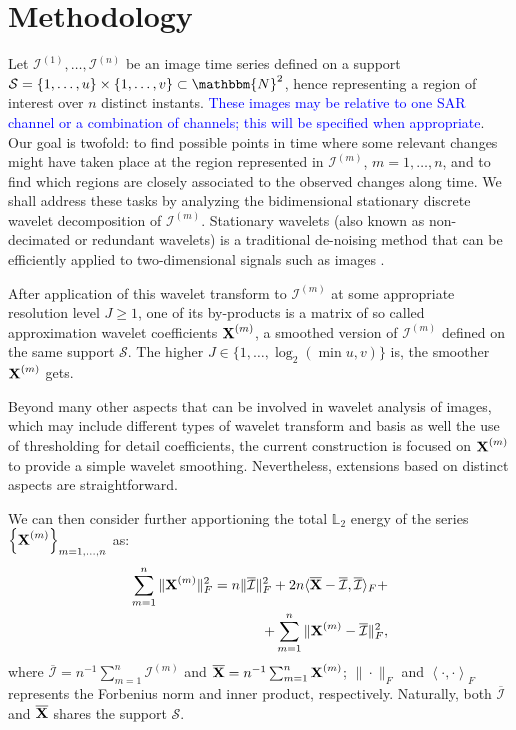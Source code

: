 \documentclass[journal]{IEEEtran}
\newcommand{\vX}{{\textbf X}}
\begin{document}
\section{Methodology}\label{section_method}


Let $\mathcal{I}^{(1)},\ldots,\mathcal{I}^{(n)}$ be an image time series defined on a support $\mathcal{S} = \left\lbrace 1,\ldots,u  \right\rbrace \times \left\lbrace 1,\ldots,v  \right\rbrace \subset \mathbbm{N}^2$, hence representing a region of interest over $n$ distinct instants.
%
\textcolor{blue}{These images may be relative to one SAR channel or a combination of channels; this will be specified when appropriate}. Our goal is twofold: to find possible points in time where some relevant changes might have taken place at the region represented in $\mathcal{I}^{(m)}$, $m=1,\ldots,n$, and to find which regions are closely associated to the observed changes along time. We shall address these tasks by analyzing the bidimensional stationary discrete wavelet decomposition of $\mathcal{I}^{(m)}$. Stationary wavelets (also known as non-decimated or redundant wavelets) is a traditional de-noising method that can be efficiently applied to two-dimensional signals such as images \cite{coifman1995translation,atto2012multidate,atto2016wavelet}. 


After application of this wavelet transform to $\mathcal{I}^{(m)}$ at some appropriate resolution level $J\geq 1$, one of its by-products is a matrix of so called approximation wavelet coefficients $\vX^{(m)}$, a smoothed version of $\mathcal{I}^{(m)}$ 
defined on the same support $\mathcal{S}$. The higher $J\in\{1,\ldots,\log_2( \min{u,v} )\}$ is, the smoother $\vX^{(m)}$ gets.

Beyond many other aspects that can be involved in wavelet analysis of images, which may include different types of wavelet transform and basis as well the use of thresholding for detail coefficients, the current construction is focused on $\vX^{(m)}$ to provide a simple wavelet smoothing. Nevertheless, extensions based on distinct aspects are straightforward.

We can then consider further apportioning the total $\mathbb{L}_2$ energy of the series $\left\{\vX^{(m)}\right\}_{m=1,\ldots,n}$ as:
\begin{equation}\label{E:eq_ANOVAlogimage}
\begin{split}
\sum_{m=1}^n\|\vX^{(m)}\|_F^2
= n\|\overline{\mathcal{I}}\|_F^2 + 2n\langle\overline{\vX}-\overline{\mathcal{I}},\overline{\mathcal{I}}\rangle_F + \\
+ \sum_{m=1}^n\|\mathcal \vX^{(m)} - \overline{\mathcal{I}}\|_F^2,
\end{split}
\end{equation}
where $\overline{\mathcal{I}}=n^{-1}\sum_{m=1}^n\mathcal{I}^{(m)}$ and $\overline{\vX}=n^{-1}\sum_{m=1}^n\vX^{(m)}$; $\| \cdot \|_F$ and $\left\langle \cdot , \cdot \right\rangle_F$ represents the Forbenius norm and inner product, respectively. Naturally, both $\overline{\mathcal{I}}$ and $\overline{\vX}$ shares the support $\mathcal{S}$.
\end{document}
